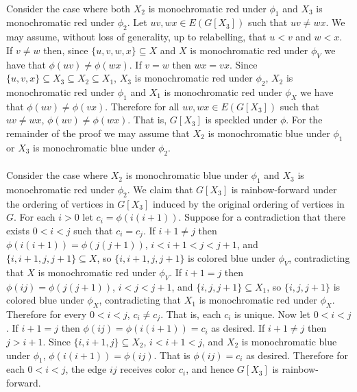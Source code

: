 \documentclass[letterpaper,12pt,oneside,onecolumn]{article}
\begin{document}
\paragraph{}
Consider the case where both $X_2$ is monochromatic red under $\phi_1$ and $X_3$ is monochromatic red under $\phi_2$. Let $uv,wx \in E(G[X_3])$ such that $uv \neq wx$. We may assume, without loss of generality, up to relabelling, that $u<v$ and $w<x$. If $v \neq w$ then, since $\{u,v,w,x\} \subseteq  X$ and $X$ is monochromatic red under $\phi_V$ we have that $\phi(uv) \neq \phi(wx)$. If $v=w$ then $wx = vx$. Since $\{u,v,x\} \subseteq X_3 \subseteq X_2 \subseteq X_1$, $X_3$ is monochromatic red under $\phi_2$, $X_2$ is monochromatic red under $\phi_1$ and $X_1$ is monochromatic red under $\phi_X$ we have that $\phi(uv) \neq \phi(vx)$. Therefore for all $uv, wx \in E(G[X_3])$ such that $uv \neq wx$, $\phi(uv) \neq \phi(wx)$. That is, $G[X_3]$ is speckled under $\phi$. For the remainder of the proof we may assume that $X_2$ is monochromatic blue under $\phi_1$ or $X_3$ is monochromatic blue under $\phi_2$.
\paragraph{}
Consider the case where $X_2$ is monochromatic blue under $\phi_1$ and $X_3$ is monochromatic red under $\phi_2$. We claim that $G[X_3]$ is rainbow-forward under the ordering of vertices in $G[X_3]$ induced by the original ordering of vertices in $G$.  For each $i>0$ let $c_i = \phi(i(i+1))$. Suppose for a contradiction that there exists $0<i<j$ such that $c_i = c_j$. If $i+1 \neq j$ then $\phi(i(i+1)) = \phi(j(j+1))$, $i<i+1<j<j+1$, and $\{i,i+1,j,j+1\} \subseteq X$, so $\{i,i+1,j,j+1\}$ is colored blue under $\phi_V$, contradicting that $X$ is monochromatic red under $\phi_V$. If $i+1 = j$ then $\phi(ij) = \phi(j(j+1))$, $i<j<j+1$, and $\{i, j, j+1 \} \subseteq X_1$, so $\{i,j,j+1\}$ is colored blue under $\phi_X$, contradicting that $X_1$ is monochromatic red under $\phi_X$. Therefore for every $0<i<j$, $c_i \neq c_j$. That is, each $c_i$ is unique. Now let $0<i<j$. If $i+1=j$ then $\phi(ij) = \phi(i(i+1)) = c_i$ as desired. If $i+1 \neq j$ then $j > i+1$. Since $\{i,i+1,j\} \subseteq X_2$, $i<i+1<j$, and $X_2$ is monochromatic blue under $\phi_1$, $\phi(i(i+1)) = \phi(ij)$. That is $\phi(ij) = c_i$ as desired. Therefore for each $0<i<j$, the edge $ij$ receives color $c_i$, and hence $G[X_3]$ is rainbow-forward.
\end{document}
